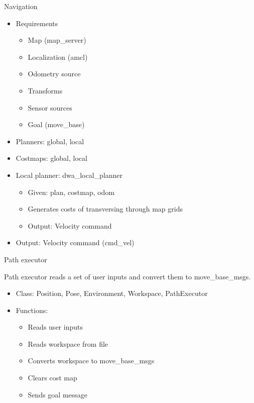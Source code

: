 \begin{frame}{Navigation}
\begin{itemize}
	\item Requirements
		\begin{itemize}
			\item Map (map\_server)
			\item Localization (amcl)
			\item Odometry source
			\item Transforms
			\item Sensor sources
			\item Goal (move\_base) 
		\end{itemize}
	\item Planners: global, local
	\item Costmaps: global, local
	\item Local planner: dwa\_local\_planner
		\begin{itemize}
			\item Given: plan, costmap, odom
			\item Generates costs of transversing through map grids
			\item Output: Velocity command
		\end{itemize} 
	\item Output: Velocity command (cmd\_vel)
\end{itemize}
\end{frame}
\begin{frame}{Path executor}
    
    Path executor reads  a set of user inputs and convert them to move\_base\_msgs.
    \begin{itemize}
        \item Class: Position, Pose, Environment, Workspace, PathExecutor
        
        \item Functions:
        \begin{itemize}
        	\item Reads user inputs
        	\item Reads workspace from file
            \item Converts workspace to move\_base\_msgs
            \item Clears cost map
            \item Sends goal message
        \end{itemize}
    \end{itemize}
    
\end{frame}

